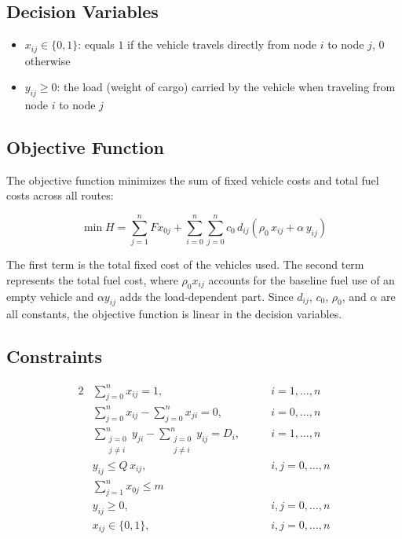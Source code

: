 \documentclass [a4paper, 11pt, titlepage] {article}
\begin{document}
\subsection{Decision Variables}

\begin{itemize}
    \item $x_{ij} \in \{0,1\}$: equals $1$ if the vehicle travels directly from node $i$ to node $j$, $0$ otherwise
    \item $y_{ij} \geq 0$: the load (weight of cargo) carried by the vehicle when traveling from node $i$ to node $j$
\end{itemize}

\subsection{Objective Function}

The objective function minimizes the sum of fixed vehicle costs and total fuel costs across all routes:

\begin{equation}
    \min H = \sum_{j=1}^{n} F x_{0j} + \sum_{i=0}^{n} \sum_{j=0}^{n} c_0 \, d_{ij} \left( \rho_0 \, x_{ij} + \alpha \, y_{ij} \right) \label{eq:obj}
\end{equation}

The first term is the total fixed cost of the vehicles used. The second term represents the total fuel cost, where $\rho_0 x_{ij}$ accounts for the baseline fuel use of an empty vehicle and $\alpha y_{ij}$ adds the load-dependent part. Since $d_{ij}$, $c_0$, $\rho_0$, and $\alpha$ are all constants, the objective function is linear in the decision variables.

\subsection{Constraints}

\begin{alignat}{2}
    & \sum_{j=0}^{n} x_{ij} = 1, \qquad & i = 1, \ldots, n \label{eq:c1} \\[6pt]
    & \sum_{j=0}^{n} x_{ij} - \sum_{j=0}^{n} x_{ji} = 0, \qquad & i = 0, \ldots, n \label{eq:c2} \\[6pt]
    & \sum_{\substack{j=0 \\ j \neq i}}^{n} y_{ji} - \sum_{\substack{j=0 \\ j \neq i}}^{n} y_{ij} = D_i, \qquad & i = 1, \ldots, n \label{eq:c3} \\[6pt]
    & y_{ij} \leq Q \, x_{ij}, \qquad & i,j = 0, \ldots, n \label{eq:c4} \\[6pt]
    & \sum_{j=1}^{n} x_{0j} \leq m & \label{eq:c5} \\[6pt]
    & y_{ij} \geq 0, \qquad & i,j = 0, \ldots, n \label{eq:c6} \\[6pt]
    & x_{ij} \in \{0,1\}, \qquad & i,j = 0, \ldots, n \label{eq:c7}
\end{alignat}
\end{document}
